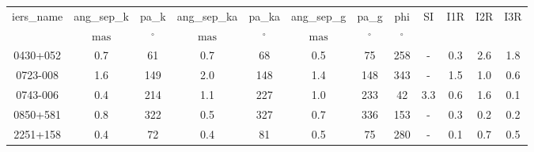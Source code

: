 \begin{table}
\begin{tabular}{cccccccccccc}
iers_name & ang_sep_k & pa_k & ang_sep_ka & pa_ka & ang_sep_g & pa_g & phi & SI & I1R & I2R & I3R \\
 & $\mathrm{mas}$ & $\mathrm{{}^{\circ}}$ & $\mathrm{mas}$ & $\mathrm{{}^{\circ}}$ & $\mathrm{mas}$ & $\mathrm{{}^{\circ}}$ & $\mathrm{{}^{\circ}}$ &  &  &  &  \\
0430+052 & 0.7 & 61 & 0.7 & 68 & 0.5 & 75 & 258 & - & 0.3 & 2.6 & 1.8 \\
0723-008 & 1.6 & 149 & 2.0 & 148 & 1.4 & 148 & 343 & - & 1.5 & 1.0 & 0.6 \\
0743-006 & 0.4 & 214 & 1.1 & 227 & 1.0 & 233 & 42 & 3.3 & 0.6 & 1.6 & 0.1 \\
0850+581 & 0.8 & 322 & 0.5 & 327 & 0.7 & 336 & 153 & - & 0.3 & 0.2 & 0.2 \\
2251+158 & 0.4 & 72 & 0.4 & 81 & 0.5 & 75 & 280 & - & 0.1 & 0.7 & 0.5 \\
\end{tabular}
\end{table}
